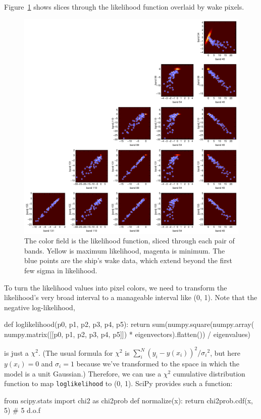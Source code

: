 \documentclass[12pt]{article}
\begin{document}
Figure~\ref{plot_6x6grid_likelihood} shows slices through the
likelihood function overlaid by wake pixels.

\begin{figure}
\begin{center}
\includegraphics[width=\linewidth]{plot_6x6grid_likelihood.png}
\end{center}
\caption{The color field is the likelihood function, sliced through
  each pair of bands.  Yellow is maximum likelihood, magenta is
  minimum.  The blue points are the ship's wake data, which extend
  beyond the first few sigma in likelihood.
 \label{plot_6x6grid_likelihood}}
\end{figure}

\pagebreak
To turn the likelihood values into pixel colors, we need to transform
the likelihood's very broad interval to a manageable interval like (0,
1).  Note that the negative log-likelihood,
\begin{python}
def loglikelihood(p0, p1, p2, p3, p4, p5):
    return sum(numpy.square(numpy.array(
        numpy.matrix([[p0, p1, p2, p3, p4, p5]]) * eigenvectors).flatten())
        / eigenvalues)
\end{python}
is just a $\chi^2$.  (The usual formula for $\chi^2$ is $\sum_i^N (y_i
- y(x_i))^2/{\sigma_i}^2$, but here $y(x_i) = 0$ and $\sigma_i = 1$
because we've transformed to the space in which the model is a unit
Gaussian.)  Therefore, we can use a $\chi^2$ cumulative distribution
function to map {\tt loglikelihood} to (0, 1).  SciPy provides such a
function:
\begin{python}
from scipy.stats import chi2 as chi2prob
def normalize(x):
    return chi2prob.cdf(x, 5)   # 5 d.o.f
\end{python}
\end{document}
